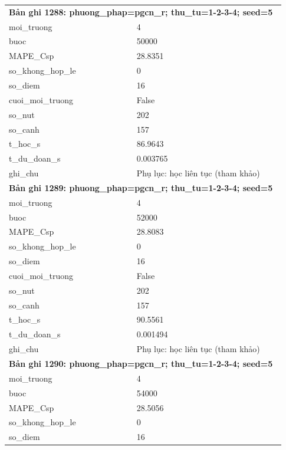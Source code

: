 \begin{longtable}{p{0.43\linewidth}p{0.50\linewidth}}
\midrule
\multicolumn{2}{p{0.95\linewidth}}{\textbf{Bản ghi 1288: phuong\_phap=pgcn\_r; thu\_tu=1-2-3-4; seed=5}} \\
moi\_\allowbreak truong & 4 \\
buoc & 50000 \\
MAPE\_\allowbreak Csp & 28.8351 \\
so\_\allowbreak khong\_\allowbreak hop\_\allowbreak le & 0 \\
so\_\allowbreak diem & 16 \\
cuoi\_\allowbreak moi\_\allowbreak truong & False \\
so\_\allowbreak nut & 202 \\
so\_\allowbreak canh & 157 \\
t\_\allowbreak hoc\_\allowbreak s & 86.9643 \\
t\_\allowbreak du\_\allowbreak doan\_\allowbreak s & 0.003765 \\
ghi\_\allowbreak chu & Phụ lục: học liên tục (tham khảo) \\
\midrule
\multicolumn{2}{p{0.95\linewidth}}{\textbf{Bản ghi 1289: phuong\_phap=pgcn\_r; thu\_tu=1-2-3-4; seed=5}} \\
moi\_\allowbreak truong & 4 \\
buoc & 52000 \\
MAPE\_\allowbreak Csp & 28.8083 \\
so\_\allowbreak khong\_\allowbreak hop\_\allowbreak le & 0 \\
so\_\allowbreak diem & 16 \\
cuoi\_\allowbreak moi\_\allowbreak truong & False \\
so\_\allowbreak nut & 202 \\
so\_\allowbreak canh & 157 \\
t\_\allowbreak hoc\_\allowbreak s & 90.5561 \\
t\_\allowbreak du\_\allowbreak doan\_\allowbreak s & 0.001494 \\
ghi\_\allowbreak chu & Phụ lục: học liên tục (tham khảo) \\
\midrule
\multicolumn{2}{p{0.95\linewidth}}{\textbf{Bản ghi 1290: phuong\_phap=pgcn\_r; thu\_tu=1-2-3-4; seed=5}} \\
moi\_\allowbreak truong & 4 \\
buoc & 54000 \\
MAPE\_\allowbreak Csp & 28.5056 \\
so\_\allowbreak khong\_\allowbreak hop\_\allowbreak le & 0 \\
so\_\allowbreak diem & 16 \\

\end{longtable}
